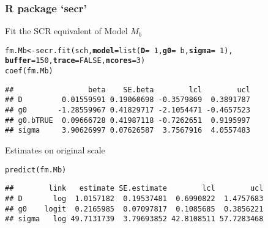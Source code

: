 \documentclass[color=usenames,dvipsnames]{beamer}\usepackage[]{graphicx}\usepackage[]{color}
\makeatletter
\newcommand{\hlnum}[1]{\textcolor[rgb]{0.69,0.494,0}{#1}}%
\newcommand{\hlopt}[1]{\textcolor[rgb]{0,0,0}{#1}}%
\newcommand{\hlstd}[1]{\textcolor[rgb]{0,0,0}{#1}}%
\newcommand{\hlkwb}[1]{\textcolor[rgb]{0,0.341,0.682}{#1}}%
\newcommand{\hlkwc}[1]{\textcolor[rgb]{0,0,0}{\textbf{#1}}}%
\newcommand{\hlkwd}[1]{\textcolor[rgb]{0.004,0.004,0.506}{#1}}%
\newenvironment{kframe}{%
 \def\at@end@of@kframe{}%
 \ifinner\ifhmode%
  \def\at@end@of@kframe{\end{minipage}}%
  \begin{minipage}{\columnwidth}%
 \fi\fi%
 \def\FrameCommand##1{\hskip\@totalleftmargin \hskip-\fboxsep
 \colorbox{shadecolor}{##1}\hskip-\fboxsep
     \hskip-\linewidth \hskip-\@totalleftmargin \hskip\columnwidth}%
 \MakeFramed {\advance\hsize-\width
   \@totalleftmargin\z@ \linewidth\hsize
   \@setminipage}}%
 {\par\unskip\endMakeFramed%
 \at@end@of@kframe}
\newenvironment{knitrout}{}{} %
\makeatother
\begin{document}
\begin{frame}[fragile]
  \frametitle{R package `secr'}
  Fit the SCR equivalent of Model $M_b$
\begin{knitrout}\scriptsize
{}\color{fgcolor}\begin{kframe}
\begin{alltt}
\hlstd{fm.Mb} \hlkwb{<-} \hlkwd{secr.fit}\hlstd{(sch,} \hlkwc{model}\hlstd{=}\hlkwd{list}\hlstd{(}\hlkwc{D}\hlstd{=}\hlopt{~}\hlnum{1}\hlstd{,} \hlkwc{g0}\hlstd{=}\hlopt{~}\hlstd{b,} \hlkwc{sigma}\hlstd{=}\hlopt{~}\hlnum{1}\hlstd{),}
                  \hlkwc{buffer}\hlstd{=}\hlnum{150}\hlstd{,} \hlkwc{trace}\hlstd{=}\hlnum{FALSE}\hlstd{,} \hlkwc{ncores}\hlstd{=}\hlnum{3}\hlstd{)}
\hlkwd{coef}\hlstd{(fm.Mb)}
\end{alltt}
\begin{verbatim}
##                 beta    SE.beta        lcl        ucl
## D         0.01559591 0.19060698 -0.3579869  0.3891787
## g0       -1.28559967 0.41829717 -2.1054471 -0.4657523
## g0.bTRUE  0.09666728 0.41987118 -0.7262651  0.9195997
## sigma     3.90626997 0.07626587  3.7567916  4.0557483
\end{verbatim}
\end{kframe}
\end{knitrout}
\pause
\vfill
Estimates on original scale
\begin{knitrout}\scriptsize
{}\color{fgcolor}\begin{kframe}
\begin{alltt}
\hlkwd{predict}\hlstd{(fm.Mb)}
\end{alltt}
\begin{verbatim}
##        link   estimate SE.estimate        lcl        ucl
## D       log  1.0157182  0.19537481  0.6990822  1.4757683
## g0    logit  0.2165985  0.07097817  0.1085685  0.3856221
## sigma   log 49.7131739  3.79693852 42.8108511 57.7283468
\end{verbatim}
\end{kframe}
\end{knitrout}
\end{frame}
\end{document}
